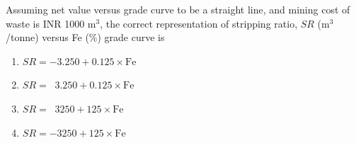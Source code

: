 \documentclass[journal]{IEEEtran}
\begin{document}
\begin{enumerate}[leftmargin=0pt]

Assuming net value versus grade curve to be a straight line, and mining cost of waste is
INR 1000 m$^3$, the correct representation of stripping ratio, $SR$ (m$^3$/tonne) versus Fe (\%) grade curve is

\begin{enumerate}
    \item $SR = -3.250 + 0.125\times \mathrm{Fe}$
    \item $SR = \;\;3.250 + 0.125\times \mathrm{Fe}$
    \item $SR = \;\;3250 + 125\times \mathrm{Fe}$
    \item $SR = -3250 + 125\times \mathrm{Fe}$
\end{enumerate}

\hfill{}



\end{enumerate}
\end{document}
